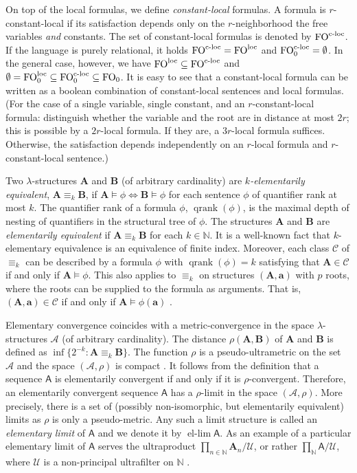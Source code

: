 \documentclass[11pt]{article}
\theoremstyle{plain}
\theoremstyle{definition}
\theoremstyle{remark}
\DeclareMathOperator\qranksym{qrank}
\newcommand{\qrank}[1]{{\qranksym({#1})}}
\newcommand{\N}{\mathbb{N}}
\DeclareMathOperator\FO{FO}
\newcommand{\FOloc}[1]{\FO_{#1}^\textnormal{loc}}
\newcommand{\FOcloc}[1]{\FO_{#1}^{\textnormal{c-loc}}}
\newcommand{\str}[1]{\mathbf{#1}}
\newcommand{\strseq}[1]{{\boldsymbol{\mathsf{#1}}}}
\newcommand{\tpl}[1]{{\bm{#1}}}
\DeclareMathOperator{\ellim}{el-lim}
\begin{document}
On top of the local formulas, we define \emph{constant-local} formulas.
A formula is $r$-constant-local if its satisfaction depends only on the $r$-neighborhood the free variables \emph{and} constants.
The set of constant-local formulas is denoted by $\FOcloc{}$.
If the language is purely relational, it holds $\FOcloc{} = \FOloc{}$ and $\FOcloc{0} = \emptyset$.
In the general case, however, we have $\FOloc{} \subseteq \FOcloc{}$ and $\emptyset = \FOloc{0} \subseteq \FOcloc{0} \subseteq \FO_0$.
It is easy to see that a constant-local formula can be written as a boolean combination of constant-local sentences and local formulas.
(For the case of a single variable, single constant, and an $r$-constant-local formula: distinguish whether the variable and the root are in distance at most $2r$; this is possible by a $2r$-local formula.
If they are, a $3r$-local formula suffices.
Otherwise, the satisfaction depends independently on an $r$-local formula and $r$-constant-local sentence.)

Two $\lambda$-structures $\str{A}$ and $\str{B}$ (of arbitrary cardinality) are \emph{$k$-elementarily equivalent}, $\str{A} \equiv_k \str{B}$, if $\str{A} \models \phi \Leftrightarrow \str{B} \models \phi$ for each sentence $\phi$ of quantifier rank at most $k$.
The quantifier rank of a formula $\phi$, $\qrank{\phi}$, is the maximal depth of nesting of quantifiers in the structural tree of $\phi$.
The structures $\str{A}$ and $\str{B}$ are \emph{elementarily equivalent} if $\str{A} \equiv_k \str{B}$ for each $k \in \N$.
It is a well-known fact that $k$-elementary equivalence is an equivalence of finite index.
Moreover, each class $\mathcal{C}$ of $\equiv_k$ can be described by a formula $\phi$ with $\qrank{\phi} = k$ satisfying that $\str{A} \in \mathcal{C}$ if and only if $\str{A} \models \phi$.
This also applies to $\equiv_k$ on structures $(\str{A}, \tpl{a})$ with $p$ roots, where the roots can be supplied to the formula as arguments.
That is, $(\str{A}, \tpl{a}) \in \mathcal{C}$ if and only if $\str{A} \models \phi(\tpl{a})$ \cite{hodges}.



Elementary convergence coincides with a metric-convergence in the space $\lambda$-structures $\mathcal{A}$ (of arbitrary cardinality).
The distance $\rho(\str{A}, \str{B})$ of $\str{A}$ and $\str{B}$ is defined as $\inf \{ 2^{-k} : \str{A} \equiv_k \str{B} \}$.
The function $\rho$ is a pseudo-ultrametric on the set $\mathcal{A}$ and the space $(\mathcal{A}, \rho)$ is compact \cite[Proposition~2.18]{unified_approach}.
It follows from the definition that a sequence $\strseq{A}$ is elementarily convergent if and only if it is $\rho$-convergent.
Therefore, an elementarily convergent sequence $\strseq{A}$ has a $\rho$-limit in the space $(\mathcal{A}, \rho)$.
More precisely, there is a set of (possibly non-isomorphic, but elementarily equivalent) limits as $\rho$ is only a pseudo-metric.
Any such a limit structure is called an \emph{elementary limit} of $\strseq{A}$ and we denote it by $\ellim \strseq{A}$.
As an example of a particular elementary limit of $\strseq{A}$ serves the ultraproduct $\prod_{n \in \N} \str{A}_n / \mathcal{U}$, or rather $\prod_\N \strseq{A} / \mathcal{U}$, where $\mathcal{U}$ is a non-principal ultrafilter on $\N$ \cite{chang_keisler}.
\end{document}
